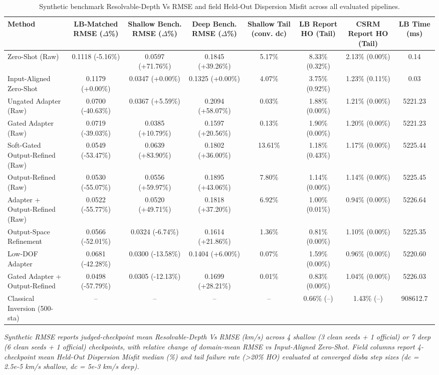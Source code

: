\begin{table}[t]
\centering
\scriptsize
\caption{Synthetic benchmark Resolvable-Depth Vs RMSE and field Held-Out Dispersion Misfit across all evaluated pipelines.}
\label{tab:benchmark_overview}
\begin{tabular}{lccccccc}
\toprule
Method & LB-Matched RMSE ($\Delta$\%) & Shallow Bench. RMSE ($\Delta$\%) & Deep Bench. RMSE ($\Delta$\%) & Shallow Tail (conv. dc) & LB Report HO (Tail) & CSRM Report HO (Tail) & LB Time (ms) \\
\midrule
Zero-Shot (Raw) & 0.1118 (-5.16\%) & 0.0597 (+71.76\%) & 0.1845 (+39.26\%) & 5.17\% & 8.33\% (0.32\%) & 2.13\% (0.00\%) & 0.14 \\
Input-Aligned Zero-Shot & 0.1179 (+0.00\%) & 0.0347 (+0.00\%) & 0.1325 (+0.00\%) & 4.07\% & 3.75\% (0.92\%) & 1.23\% (0.11\%) & 0.03 \\
Ungated Adapter (Raw) & 0.0700 (-40.63\%) & 0.0367 (+5.59\%) & 0.2094 (+58.07\%) & 0.03\% & 1.88\% (0.00\%) & 1.21\% (0.00\%) & 5221.23 \\
Gated Adapter (Raw) & 0.0719 (-39.03\%) & 0.0385 (+10.79\%) & 0.1597 (+20.56\%) & 0.13\% & 1.90\% (0.00\%) & 1.20\% (0.00\%) & 5221.23 \\
Soft-Gated Output-Refined (Raw) & 0.0549 (-53.47\%) & 0.0639 (+83.90\%) & 0.1802 (+36.00\%) & 13.61\% & 1.18\% (0.43\%) & 1.17\% (0.00\%) & 5225.44 \\
Output-Refined (Raw) & 0.0530 (-55.07\%) & 0.0556 (+59.97\%) & 0.1895 (+43.06\%) & 7.80\% & 1.14\% (0.00\%) & 1.14\% (0.00\%) & 5225.45 \\
Adapter + Output-Refined (Raw) & 0.0522 (-55.77\%) & 0.0520 (+49.71\%) & 0.1818 (+37.20\%) & 6.92\% & 1.00\% (0.01\%) & 0.94\% (0.00\%) & 5226.64 \\
Output-Space Refinement & 0.0566 (-52.01\%) & 0.0324 (-6.74\%) & 0.1614 (+21.86\%) & 1.36\% & 0.81\% (0.00\%) & 1.10\% (0.00\%) & 5225.35 \\
Low-DOF Adapter & 0.0681 (-42.28\%) & 0.0300 (-13.58\%) & 0.1404 (+6.00\%) & 0.07\% & 1.59\% (0.00\%) & 0.96\% (0.00\%) & 5220.60 \\
Gated Adapter + Output-Refined & 0.0498 (-57.79\%) & 0.0305 (-12.13\%) & 0.1699 (+28.21\%) & 0.01\% & 0.83\% (0.00\%) & 1.04\% (0.00\%) & 5226.03 \\
Classical Inversion (500-sta) & -- & -- & -- & -- & 0.66\% (--) & 1.43\% (--) & 908612.7 \\
\bottomrule
\end{tabular}
\par\vspace{2pt}\noindent\footnotesize{\textit{Synthetic RMSE reports judged-checkpoint mean Resolvable-Depth Vs RMSE (km/s) across 4 shallow (3 clean seeds + 1 official) or 7 deep (6 clean seeds + 1 official) checkpoints, with relative change of domain-mean RMSE vs Input-Aligned Zero-Shot. Field columns report 4-checkpoint mean Held-Out Dispersion Misfit median (\%) and tail failure rate (>20\% HO) evaluated at converged disba step sizes (dc = 2.5e-5 km/s shallow, dc = 5e-3 km/s deep).}}
\end{table}
